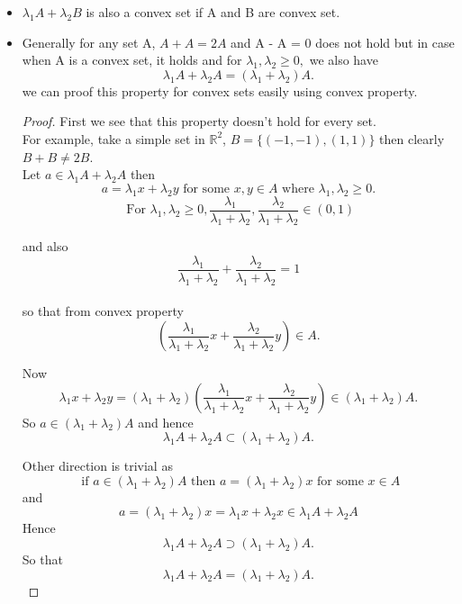 \documentclass[oneside]{book}
\begin{document}
	
	\begin{itemize}
		\item $\lambda_{1} A+\lambda_{2} B $ is also a convex set if A and B are convex set. 
		\item
		Generally for any set A, $A +A = 2A $ and A - A = 0  does not hold but in case when A is a convex set, it holds and for $\lambda_{1}, \lambda_{2} \geq 0,$ we also have $$\lambda_{1} A+\lambda_{2} A=(\lambda_{1}+\lambda_{2}) A.$$
		we can proof this property for convex sets easily using convex property.
		\begin{proof}
			First we see that this property doesn't hold for every set. \\
			For example, take a simple set in $\mathbb{R}^2$, $B = \{ (-1,-1),(1,1)\}$ then clearly $ B + B \neq 2B. $ \\
			Let $a \in \lambda_{1} A  + \lambda_{2} A $ then $$a = \lambda_{1} x + \lambda_{2} y \text{ for some } x, y \in A \text{ where } \lambda_{1}, \lambda_{2} \geq 0. $$
			$$
			\text{ For } \lambda_{1}, \lambda_{2} \geq 0, \frac{\lambda_{1}}{\lambda_{1}+\lambda_{2}}, \frac{\lambda_{2}}{\lambda_{1}+\lambda_{2}} \in (0, 1) $$
			
			and also
			$$ \frac{\lambda_{1}}{\lambda_{1}+\lambda_{2}}+\frac{\lambda_{2}}{\lambda_{1}+\lambda_{2}}=1$$ \\
			so that from convex property $$\left(\frac{\lambda_{1}}{\lambda_{1}+\lambda_{2}} x+\frac{\lambda_{2}}{\lambda_{1}+\lambda_{2}} y\right) \in A.
			$$
			
			Now 
			\[
			\lambda_{1} x+\lambda_{2} y=(\lambda_{1}+\lambda_{2})\left(\frac{\lambda_{1}}{\lambda_{1}+\lambda_{2}} x+\frac{\lambda_{2}}{\lambda_{1}+\lambda_{2}} y\right) \in(\lambda_{1}+\lambda_{2}) A.
			\]
			So $a \in (\lambda_{1}+\lambda_{2}) A$ and hence 
			\[ \lambda_{1}A + \lambda_{2}A \subset (\lambda_{1}+\lambda_{2}) A. \]
			
			
			Other direction is trivial as 
			$$ \text{ if } a \in (\lambda_{1} +\lambda_{2}) A \text{ then }
			a = (\lambda_{1} +\lambda_{2})x \text{ for some } x \in A $$
			and
			$$
			a = (\lambda_{1} +\lambda_{2})x =  \lambda_{1} x +\lambda_{2} x \in \lambda_{1} A +\lambda_{2} A
			$$
			Hence
			\[ \lambda_{1}A + \lambda_{2}A \supset (\lambda_{1}+\lambda_{2}) A. \]
			So that
			$$\lambda_{1} A+\lambda_{2} A=(\lambda_{1}+\lambda_{2}) A.$$    
		\end{proof}
		
		
		
		
		
		
		
		
		
		
		
		
		
		
		
		
		
		
		
		
		
		
		
		
		
		
		
		
		
		
	\end{itemize}
	
\end{document}
